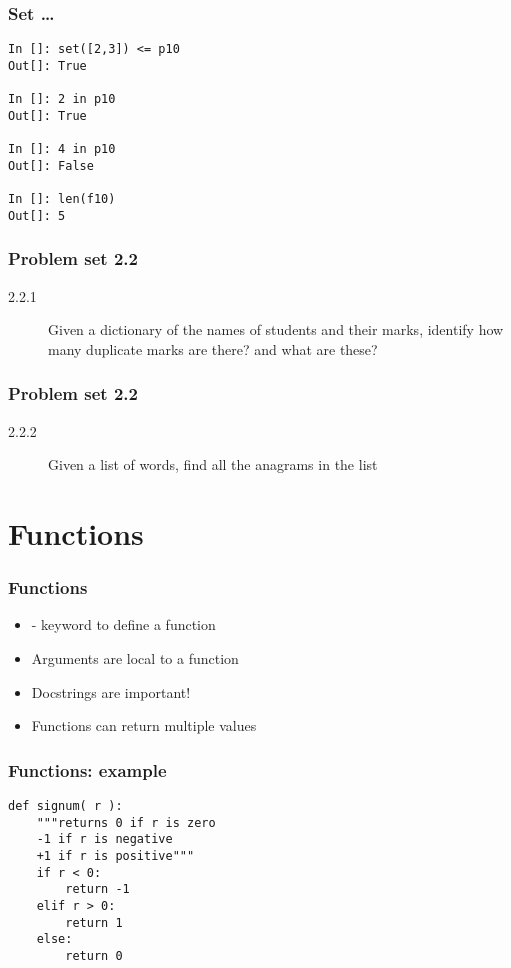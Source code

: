 \documentclass[14pt,compress]{beamer}
\newcounter{time}
\newcommand{\inctime}[1]{\addtocounter{time}{#1}{\tiny \thetime\ m}}
\newcommand{\kwrd}[1]{ \texttt{\textbf{\color{blue}{#1}}}  }
\begin{document}
\begin{frame}[fragile]
  \frametitle{Set \ldots}
    \begin{lstlisting}
In []: set([2,3]) <= p10
Out[]: True

In []: 2 in p10
Out[]: True

In []: 4 in p10
Out[]: False

In []: len(f10)
Out[]: 5
\end{lstlisting}
\end{frame}

\begin{frame}
  \frametitle{Problem set 2.2}
  \begin{description}
    \item[2.2.1] Given a dictionary of the names of students and their marks, identify how many duplicate marks are there? and what are these?
\end{description}
\inctime{15}
\end{frame}

\begin{frame}
  \frametitle{Problem set 2.2}
  \begin{description}
    \item[2.2.2] Given a list of words, find all the anagrams in the list
\end{description}
\inctime{15}
\end{frame}

\section{Functions}
\begin{frame}[fragile]
  \frametitle{Functions}
  \begin{itemize}
    \item \kwrd{def} - keyword to define a function
    \item Arguments are local to a function
    \item Docstrings are important!
    \item Functions can return multiple values
  \end{itemize}
\end{frame}

\begin{frame}[fragile]
  \frametitle{Functions: example}
  \begin{lstlisting}
def signum( r ):
    """returns 0 if r is zero
    -1 if r is negative
    +1 if r is positive"""
    if r < 0:
        return -1
    elif r > 0:
        return 1
    else:
        return 0
  \end{lstlisting}
\end{frame}
\end{document}
